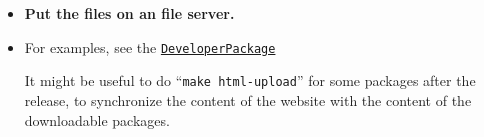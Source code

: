 \documentclass[12pt]{article}
\begin{document}
\begin{itemize}
\item {\bf Put the files on an file server.}

\item For examples, see the \href{../developer-package/developer-package.tex}{\tt DeveloperPackage} 

  It might be useful to do ``{\tt make html-upload}'' for some packages after the release, to synchronize the content of the website with the content of the downloadable packages. 
\end{itemize}
\end{document}
